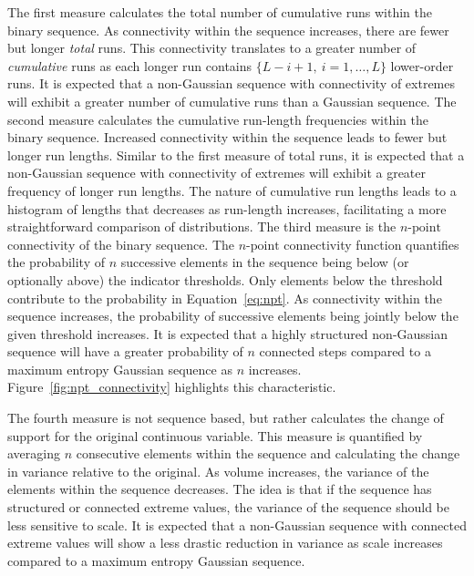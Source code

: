 The first measure calculates the total number of cumulative runs within the binary sequence. As connectivity within the sequence increases, there are fewer but longer \emph{total} runs. This connectivity translates to a greater number of \emph{cumulative} runs as each longer run contains $\{L-i+1, \ i=1,\dots,L\}$ lower-order runs. It is expected that a non-Gaussian sequence with connectivity of extremes will exhibit a greater number of cumulative runs than a Gaussian sequence. The second measure calculates the cumulative run-length frequencies within the binary sequence. Increased connectivity within the sequence leads to fewer but longer run lengths. Similar to the first measure of total runs, it is expected that a non-Gaussian sequence with connectivity of extremes will exhibit a greater frequency of longer run lengths. The nature of cumulative run lengths leads to a histogram of lengths that decreases as run-length increases, facilitating a more straightforward comparison of distributions. The third measure is the $n\text{-point}$ connectivity of the binary sequence. The $n\text{-point}$ connectivity function quantifies the probability of $n$ successive elements in the sequence being below (or optionally above) the indicator thresholds. Only elements below the threshold contribute to the probability in Equation~\ref{eq:npt}. As connectivity within the sequence increases, the probability of successive elements being jointly below the given threshold increases. It is expected that a highly structured non-Gaussian sequence will have a greater probability of $n$ connected steps compared to a maximum entropy Gaussian sequence as $n$ increases. Figure~\ref{fig:npt_connectivity} highlights this characteristic.

The fourth measure is not sequence based, but rather calculates the change of support for the original continuous variable. This measure is quantified by averaging $n$ consecutive elements within the sequence and calculating the change in variance relative to the original. As volume increases, the variance of the elements within the sequence decreases. The idea is that if the sequence has structured or connected extreme values, the variance of the sequence should be less sensitive to scale. It is expected that a non-Gaussian sequence with connected extreme values will show a less drastic reduction in variance as scale increases compared to a maximum entropy Gaussian sequence.

